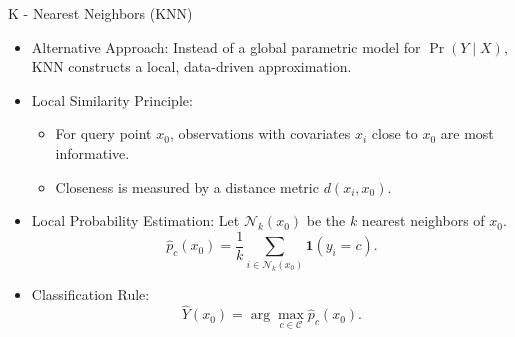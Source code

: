\documentclass[aspectratio=169]{beamer}
\newcommand{\1}{\mathbf{1}}
\begin{document}
\begin{frame}{K - Nearest Neighbors (KNN)}
    \small
    \begin{itemize}
        \item Alternative Approach: Instead of a global parametric model for $\Pr(Y \mid X)$, KNN constructs a local, data-driven approximation.
        \item Local Similarity Principle:
        \begin{itemize}
            \item For query point $x_0$, observations with covariates $x_i$ close to $x_0$ are most informative.
            \item Closeness is measured by a distance metric $d(x_i, x_0)$.
        \end{itemize}
        \item Local Probability Estimation: Let $\mathcal{N}_k(x_0)$ be the $k$ nearest neighbors of $x_0$.
        \[
            \hat{p}_c(x_0) = \frac{1}{k} \sum_{i \in \mathcal{N}_k(x_0)} \1(y_i = c).
        \]
        \item Classification Rule:
        \[
            \hat{Y}(x_0) = \arg\max_{c \in \mathcal{C}} \hat{p}_c(x_0).
        \]
    \end{itemize}
\end{frame}
\end{document}
